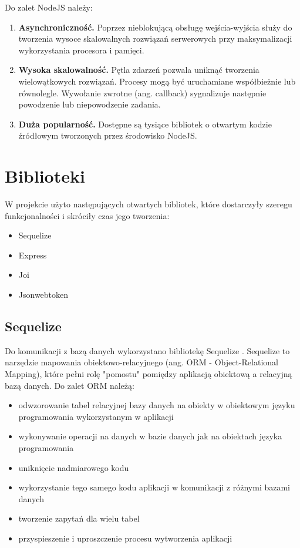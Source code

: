 \documentclass{sprz}
\begin{document}
Do zalet NodeJS należy:
\begin{enumerate}
  \item \textbf{Asynchroniczność.} Poprzez nieblokującą obsługę wejścia-wyjścia służy do tworzenia wysoce skalowalnych rozwiązań serwerowych przy maksymalizacji wykorzystania procesora i pamięci.
  \item \textbf{Wysoka skalowalność.} Pętla zdarzeń pozwala uniknąć tworzenia wielowątkowych rozwiązań. Procesy mogą być uruchamiane współbieżnie lub równolegle. Wywołanie zwrotne (ang. callback) sygnalizuje następnie powodzenie lub niepowodzenie zadania.
  \item \textbf{Duża popularność.} Dostępne są tysiące bibliotek o otwartym kodzie źródłowym tworzonych przez środowisko NodeJS.
\end{enumerate}

\section{Biblioteki}

W projekcie użyto następujących otwartych bibliotek, które dostarczyły szeregu funkcjonalności i skróciły czas jego tworzenia:
\begin{itemize}
  \item Sequelize
  \item Express
  \item Joi
  \item Jsonwebtoken
\end{itemize}

\subsection{Sequelize}

Do komunikacji z bazą danych wykorzystano bibliotekę Sequelize \cite{sequelize}. Sequelize to narzędzie mapowania obiektowo-relacyjnego (ang. ORM - Object-Relational Mapping), które pełni rolę "pomostu" pomiędzy aplikacją obiektową a relacyjną bazą danych.
Do zalet ORM należą:
\begin{itemize}
  \item odwzorowanie tabel relacyjnej bazy danych na obiekty w obiektowym języku programowania wykorzystanym w aplikacji
  \item wykonywanie operacji na danych w bazie danych jak na obiektach języka programowania
  \item uniknięcie nadmiarowego kodu
  \item wykorzystanie tego samego kodu aplikacji w komunikacji z różnymi bazami danych
  \item tworzenie zapytań dla wielu tabel
  \item przyspieszenie i uproszczenie procesu wytworzenia aplikacji
\end{itemize}
\end{document}
